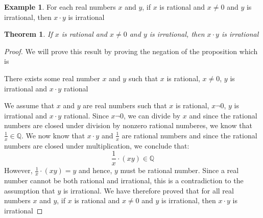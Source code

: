 \documentclass{book}
\newtheorem{theorem}{Theorem}[section]
\theoremstyle{definition}
\newtheorem{example}{Example}[definition]
\theoremstyle{remark}
\newcommand{\m}{\cdot}
\begin{document}
\newpage
\begin{example}
For each real numbers $x$ and $y$, if $x$ is rational and $x \neq 0$ and $y$ is irrational, then $x \m y$ is irrational
\begin{tcolorbox}
	\begin{theorem}
	\label{the2}		
		If $x$ is rational and $x \neq 0$ and $y$ is irrational, then $x \m y$ is irrational
	\end{theorem}
\end{tcolorbox}

\begin{proof}

We will prove this result by proving the negation of the proposition which is
	\begin{center}
		There exists some real number $x$ and $y$ such that $x$ is rational, $x \neq 0$, $y$ is irrational and $x \m y$ rational
	\end{center}

We assume that $x$ and $y$ are real numbers such that $x$ is rational, $x \neg 0$, $y$ is irrational and $x \m y$ rational. Since $x \neg 0$, we can divide by $x$ and since the rational numbers are closed under division by nonzero rational numberes, we know that $\frac{1}{x} \in \mathbb{Q}$. We now know that $x \m y$ and $\frac{1}{x}$ are rational numbers and since the rational numbers are closed under multiplication, we conclude that: 
	\begin{equation}
		\frac{1}{x} \m (xy) \in \mathbb{Q}
	\end{equation}
However, $\frac{1}{x} \m (xy) = y$ and hence, $y$ must be rational number. Since a real number cannot be both rational and irrational, this is a contradiction to the assumption that $y$ is irrational. We have therefore proved that for all real numbers $x$ and $y$, if $x$ is rational and $x \neq 0$ and $y$ is irrational, then $x \m y$ is irrational

\end{proof}
\end{example}
\end{document}

